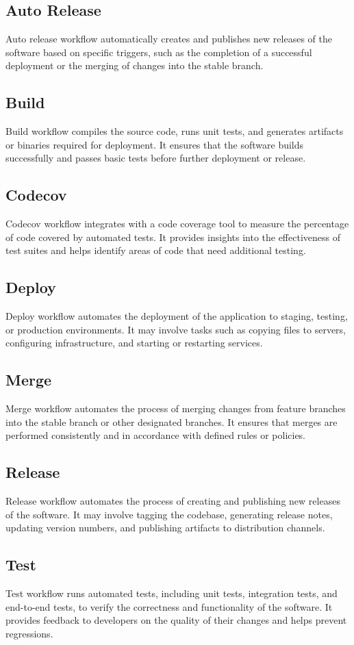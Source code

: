 \documentclass{article}
\begin{document}
\subsection{Auto Release}
Auto release workflow automatically creates and publishes new releases of the software based on specific triggers, such as the completion of a successful deployment or the merging of changes into the stable branch.
\subsection{Build}
Build workflow compiles the source code, runs unit tests, and generates artifacts or binaries required for deployment. It ensures that the software builds successfully and passes basic tests before further deployment or release.
\subsection{Codecov}
Codecov workflow integrates with a code coverage tool to measure the percentage of code covered by automated tests. It provides insights into the effectiveness of test suites and helps identify areas of code that need additional testing.
\subsection{Deploy}
Deploy workflow automates the deployment of the application to staging, testing, or production environments. It may involve tasks such as copying files to servers, configuring infrastructure, and starting or restarting services.
\subsection{Merge}
Merge workflow automates the process of merging changes from feature branches into the stable branch or other designated branches. It ensures that merges are performed consistently and in accordance with defined rules or policies.
\subsection{Release}
Release workflow automates the process of creating and publishing new releases of the software. It may involve tagging the codebase, generating release notes, updating version numbers, and publishing artifacts to distribution channels.
\subsection{Test}
Test workflow runs automated tests, including unit tests, integration tests, and end-to-end tests, to verify the correctness and functionality of the software. It provides feedback to developers on the quality of their changes and helps prevent regressions.
\end{document}
